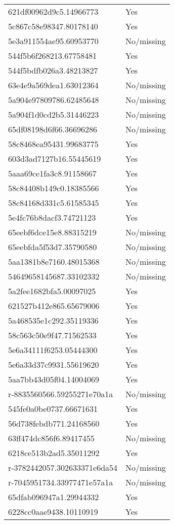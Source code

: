 \begin{tabular}{ll}
621df00962d9c5.14966773 & Yes \\
5c867c58e98347.80178140 & Yes \\
5e3a911554ae95.60953770 & No/missing \\
544f5b6f268213.67758481 & Yes \\
544f5bdfb026a3.48213827 & Yes \\
63e4e9a569dea1.63012364 & No/missing \\
5a904e97809786.62485648 & No/missing \\
5a904f1d0cd2b5.31446223 & No/missing \\
65df08198d6f66.36696286 & No/missing \\
58c8468ea95431.99683775 & Yes \\
603d3ad7127b16.55445619 & Yes \\
5aaa69ce1fa3c8.91158667 & Yes \\
58c84408b149c0.18385566 & Yes \\
58c84168d331c5.61585345 & Yes \\
5e4fc76b8dacf3.74721123 & Yes \\
65eebf6dce15e8.88315219 & No/missing \\
65eebfda5f53d7.35790580 & No/missing \\
5aa1381b8e7160.48015368 & No/missing \\
54649658145687.33102332 & No/missing \\
5a2fee1682bfa5.00097025 & Yes \\
621527b412e865.65679006 & Yes \\
5a468535e1c292.35119336 & Yes \\
58c563c50e9f47.71562533 & Yes \\
5e6a34111f6253.05444300 & Yes \\
5e6a33d37c9931.55619620 & Yes \\
5aa7bb43d05f04.14004069 & Yes \\
r-8835560566.59255271e70a1a & No/missing \\
545fe0a0be0737.66671631 & Yes \\
56d738febdb771.24168560 & Yes \\
63ff474dc856f6.89417455 & No/missing \\
6218ce513b2ad5.35011292 & Yes \\
r-3782442057.302633371e6da54 & No/missing \\
r-7045951734.33977471e57a1a & No/missing \\
65dfab096947a1.29944332 & Yes \\
6228cc0aae9438.10110919 & Yes \\

\end{tabular}
